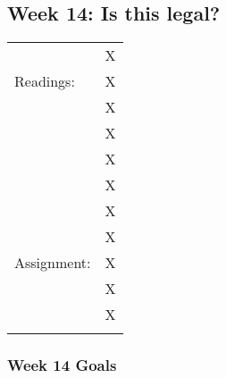 \documentclass[]{article}
\begin{document}
\subsection{Week 14: Is this legal?}\label{week-14-is-this-legal}

\begin{longtable}[c]{@{}ll@{}}
\toprule\addlinespace
& X
\\\addlinespace
Readings: & X
\\\addlinespace
& X
\\\addlinespace
& X
\\\addlinespace
& X
\\\addlinespace
& X
\\\addlinespace
& X
\\\addlinespace
& X
\\\addlinespace
Assignment: & X
\\\addlinespace
& X
\\\addlinespace
& X
\\\addlinespace
\bottomrule
\end{longtable}

\subsubsection{Week 14 Goals}\label{week-14-goals}
\end{document}
